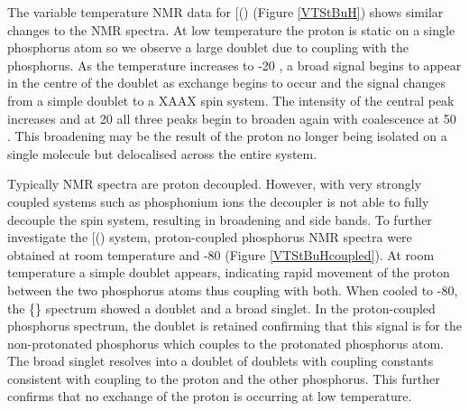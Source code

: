 The variable temperature \proton{} NMR data for [(\tButhixantphos)\ce{H]CH(SO2CF3)2} (Figure \ref{VTStBuH}) shows similar changes to the \phosphorus{} NMR spectra.  At low temperature the proton is static on a single phosphorus atom so we observe a large doublet due to coupling with the phosphorus.  As the temperature increases to -20 \degC{}, a broad signal begins to appear in the centre of the doublet as exchange begins to occur and the signal changes from a simple doublet to a XAA\textprime{}X\textprime{} spin system.  The intensity of the central peak increases and at 20 \degC{} all three peaks begin to broaden again with coalescence at 50 \degC. This broadening may be the result of the proton no longer being isolated on a single molecule but delocalised across the entire system.   

Typically \phosphorus{} NMR spectra are proton decoupled.  However, with very strongly coupled systems such as phosphonium ions the decoupler is not able to fully decouple the spin system, resulting in broadening and side bands.  To further investigate the [(\tButhixantphos)\ce{H]CH(SO2CF3)2} system, proton-coupled phosphorus NMR spectra were obtained at room temperature and -80\degC{} (Figure \ref{VTStBuHcoupled}).  At room temperature a simple doublet appears, indicating rapid movement of the proton between the two phosphorus atoms thus coupling with both.  When cooled to -80\degC{}, the \phosphorus\{\proton\} spectrum showed a doublet and a broad singlet.  In the proton-coupled phosphorus spectrum, the doublet is retained confirming that this signal is for the non-protonated phosphorus which couples to the protonated phosphorus atom.  The broad singlet resolves into a doublet of doublets with coupling constants consistent with coupling to the proton and the other phosphorus.  This further confirms that no exchange of the proton is occurring at low temperature.  

